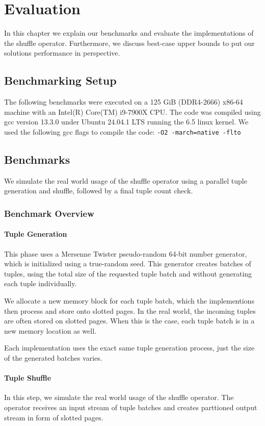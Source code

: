 
\chapter{Evaluation}\label{chapter:evaluation}\acresetall
In this chapter we explain our benchmarks and evaluate the implementations of the shuffle operator.
Furthermore, we discuss best-case upper bounds to put our solutions performance in perspective.
\section{Benchmarking Setup}
The following benchmarks were executed on a 125 GiB (DDR4-2666) x86-64 machine with an Intel(R) Core(TM) i9-7900X CPU.
The code was compiled using gcc version 13.3.0 under Ubuntu 24.04.1 LTS running the 6.5 linux kernel.
We used the following gcc flags to compile the code: \texttt{-O2 -march=native -flto}

\section{Benchmarks} We simulate the real world usage of the shuffle operator using a parallel tuple generation and shuffle, followed by a final tuple count check.

\subsection{Benchmark Overview}
\subsubsection{Tuple Generation}
This phase uses a Mersenne Twister pseudo-random 64-bit number generator, which is initialized using a true-random seed.
This generator creates batches of tuples, using the total size of the requested tuple batch and without generating each tuple individually.

We allocate a new memory block for each tuple batch, which the implementions then process and store onto slotted pages.
In the real world, the incoming tuples are often stored on slotted pages.
When this is the case, each tuple batch is in a new memory location as well.

Each implementation uses the exact same tuple generation process, just the size of the generated batches varies.
\subsubsection{Tuple Shuffle}
In this step, we simulate the real world usage of the shuffle operator.
The operator receives an input stream of tuple batches and creates parttioned output stream in form of slotted pages.


